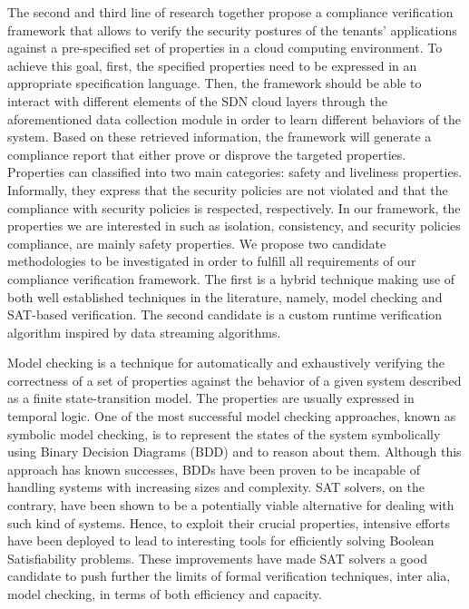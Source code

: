\documentclass[12pt]{article}
\begin{document}
The second and third line of research together propose a compliance
verification framework that allows to verify the security postures of
the tenants' applications against a pre-specified set of properties in
a cloud computing environment. To achieve this goal, first, the
specified properties need to be expressed in an appropriate
specification language. Then, the framework should be able to interact
with different elements of the SDN cloud layers through the
aforementioned data collection module in order to learn different
behaviors of the system. Based on these retrieved information, the
framework will generate a compliance report that either prove or
disprove the targeted properties. Properties can classified into two
main categories: safety and liveliness properties. Informally, they
 express that the security policies are not violated and
that the compliance with security policies is respected,
respectively.  In our framework, the properties we are interested in
such as isolation, consistency, and security policies compliance, are
mainly safety properties. We propose two candidate methodologies to be
investigated in order to fulfill all requirements of our compliance
verification framework. The first is a hybrid technique making use of
both well established techniques in the literature, namely, model
checking and SAT-based verification.  The second candidate is a custom
runtime verification algorithm inspired by data streaming algorithms.

Model checking is a technique for automatically and exhaustively
verifying the correctness of a set of properties against the behavior
of a given system described as a finite state-transition model. The
properties are usually expressed in temporal logic.  One of the most
successful model checking approaches, known as symbolic model
checking, is to represent the states of the system symbolically using
Binary Decision Diagrams (BDD) and to reason about them. Although this
approach has known successes, BDDs have been proven to be incapable of
handling systems with increasing sizes and complexity\cite{surveySAT,
  SATanaysis}.  SAT solvers, on the contrary, have been shown to be a
potentially viable alternative for dealing with such kind of
systems. Hence, to exploit their crucial properties, intensive efforts
have been deployed to lead to interesting tools for efficiently
solving Boolean Satisfiability problems. These improvements have made
SAT solvers a good candidate to push further the limits of formal
verification techniques, inter alia, model checking, in terms of both
efficiency and capacity\cite{surveySAT, SATanaysis}.
\end{document}
